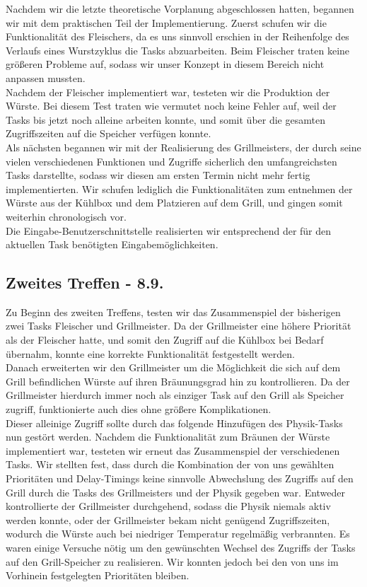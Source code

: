 Nachdem wir die letzte theoretische Vorplanung abgeschlossen hatten, begannen wir mit dem praktischen Teil der Implementierung. Zuerst schufen wir die Funktionalität des Fleischers, da es uns sinnvoll erschien in der Reihenfolge des Verlaufs eines Wurstzyklus die Tasks abzuarbeiten. Beim Fleischer traten keine größeren Probleme auf, sodass wir unser Konzept in diesem Bereich nicht anpassen mussten.\\ 
Nachdem der Fleischer implementiert war, testeten wir die Produktion der Würste. Bei diesem Test traten wie vermutet noch keine Fehler auf, weil der Tasks bis jetzt noch alleine arbeiten konnte, und somit über die gesamten Zugriffszeiten auf die Speicher verfügen konnte.\\

Als nächsten begannen wir mit der Realisierung des Grillmeisters, der durch seine vielen verschiedenen Funktionen und Zugriffe sicherlich den umfangreichsten Tasks darstellte, sodass wir diesen am ersten Termin nicht mehr fertig implementierten. Wir schufen lediglich die Funktionalitäten zum entnehmen der Würste aus der Kühlbox und dem Platzieren auf dem Grill, und gingen somit weiterhin chronologisch vor.\\
Die Eingabe-Benutzerschnittstelle realisierten wir entsprechend der für den aktuellen Task benötigten Eingabemöglichkeiten.

\subsection{Zweites Treffen - 8.9.}

Zu Beginn des zweiten Treffens, testen wir das Zusammenspiel der bisherigen zwei Tasks Fleischer und Grillmeister. Da der Grillmeister eine höhere Priorität als der Fleischer hatte, und somit den Zugriff auf die Kühlbox bei Bedarf übernahm, konnte eine korrekte Funktionalität festgestellt werden.\\
Danach erweiterten wir den Grillmeister um die Möglichkeit die sich auf dem Grill befindlichen Würste auf ihren Bräunungsgrad hin zu kontrollieren. Da der Grillmeister hierdurch immer noch als einziger Task auf den Grill als Speicher zugriff, funktionierte auch dies ohne größere Komplikationen.\\

Dieser alleinige Zugriff sollte durch das folgende Hinzufügen des Physik-Tasks nun gestört werden. Nachdem die Funktionalität zum Bräunen der Würste implementiert war, testeten wir erneut das Zusammenspiel der verschiedenen Tasks. Wir stellten fest, dass durch die Kombination der von uns gewählten Prioritäten und Delay-Timings keine sinnvolle Abwechslung des Zugriffs auf den Grill durch die Tasks des Grillmeisters und der Physik gegeben war. Entweder kontrollierte der Grillmeister durchgehend, sodass die Physik niemals aktiv werden konnte, oder der Grillmeister bekam nicht genügend Zugriffszeiten, wodurch die Würste auch bei niedriger Temperatur regelmäßig verbrannten. Es waren einige Versuche nötig um den gewünschten Wechsel des Zugriffs der Tasks auf den Grill-Speicher zu realisieren. Wir konnten jedoch bei den von uns im Vorhinein festgelegten Prioritäten bleiben.\\

